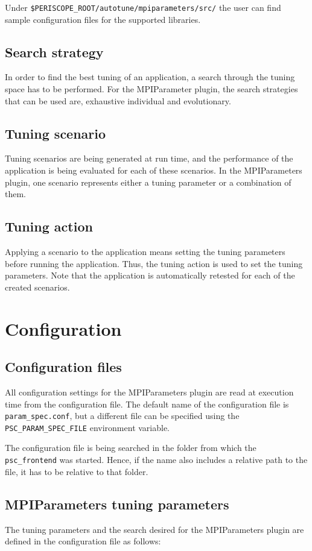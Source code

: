 \documentclass[11pt,a4paper, oneside]{book} %
\begin{document}
Under { \tt \$PERISCOPE\_ROOT/autotune/mpiparameters/src/} the user can find sample configuration files for the supported libraries.

\section{Search strategy}
In order to find the best tuning of an application, a search through the tuning space has to be performed. For the MPIParameter plugin, the search strategies that can be used are, exhaustive individual and evolutionary.


\section{Tuning scenario}
Tuning scenarios are  being generated at run time, and the performance of the application is being evaluated for each of these scenarios. In the MPIParameters plugin, one scenario represents either a tuning parameter or a combination of them.

\section{Tuning action}

Applying a scenario to the application means setting the tuning parameters before running the application. Thus, the tuning action is used to set the tuning parameters. Note that the application is automatically retested for each of the created scenarios.

\chapter{Configuration}
\section{Configuration files}
All configuration settings for the MPIParameters plugin are read at execution time from the configuration file. The default name of the configuration file is \texttt{param\_spec.conf}, but a different file can be specified using the {\tt PSC\_PARAM\_SPEC\_FILE} environment variable.

The configuration file is being searched in the folder from which the \texttt{psc\_frontend} was started. Hence, if the name also includes a relative path to the file, it has to be relative to that folder.

\section{MPIParameters tuning parameters}
The tuning parameters and the search desired for the MPIParameters plugin are defined in the configuration file as follows:
\end{document}
